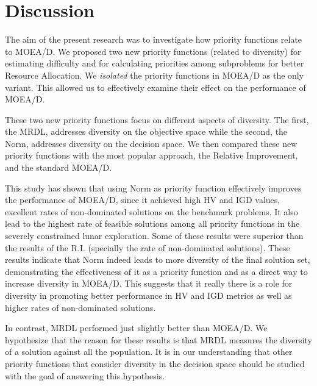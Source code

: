 \section{Discussion}
The aim of the present research was to investigate how priority functions relate to MOEA/D. We proposed two new priority functions (related to diversity) for estimating difficulty and for calculating priorities among subproblems for better Resource Allocation. We \emph{isolated} the priority functions in MOEA/D as the only variant. This allowed us to effectively examine their effect on the performance of MOEA/D.

These two new priority functions focus on different aspects of diversity. The first, the MRDL, addresses diversity on the objective space while the second, the Norm, addresses diversity on the decision space. We then compared these new priority functions with the most popular approach, the Relative Improvement, and the standard MOEA/D.

This study has shown that using Norm as priority function effectively improves the performance of MOEA/D, since it achieved high HV and IGD values, excellent rates of non-dominated solutions on the benchmark problems. It also lead to the highest rate of feasible solutions among all priority functions in the severely constrained lunar exploration. Some of these results were superior than the results of the R.I. (specially the rate of non-dominated solutions). These results indicate that Norm indeed leads to more diversity of the final solution set, demonstrating the effectiveness of it as a priority function and as a direct way to increase diversity in MOEA/D. This suggests that it really there is a role for diversity in promoting better performance in HV and IGD metrics as well as higher rates of non-dominated solutions.  

In contrast, MRDL performed just slightly better than MOEA/D. We hypothesize that the reason for these results is that MRDL measures the diversity of a solution against all the population. It is in our understanding that other priority functions that consider diversity in the decision space should be studied with the goal of answering this hypothesis. 


